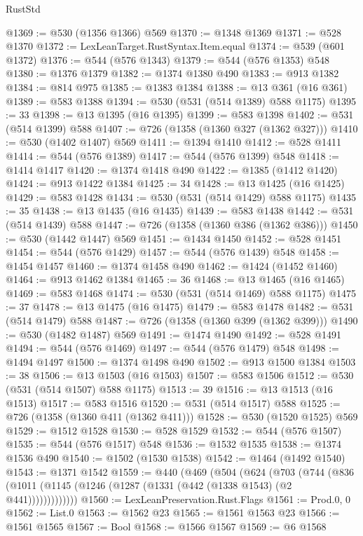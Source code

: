 \begin{lexlean}{RustStd}
\begin{coremodule}
@1369 := @530 (@1356 @1366) @569
@1370 := @1348 @1369
@1371 := @528 @1370
@1372 := LexLeanTarget.RustSyntax.Item.equal
@1374 := @539 (@601 @1372)
@1376 := @544 (@576 @1343)
@1379 := @544 (@576 @1353) @548
@1380 := @1376 @1379
@1382 := @1374 @1380 @490
@1383 := @913 @1382
@1384 := @814 @975
@1385 := @1383 @1384
@1388 := @13 @361 (@16 @361)
@1389 := @583 @1388
@1394 := @530 (@531 (@514 @1389) @588 @1175)
@1395 := 33
@1398 := @13 @1395 (@16 @1395)
@1399 := @583 @1398
@1402 := @531 (@514 @1399) @588
@1407 := @726 (@1358 (@1360 @327 (@1362 @327)))
@1410 := @530 (@1402 @1407) @569
@1411 := @1394 @1410
@1412 := @528 @1411
@1414 := @544 (@576 @1389)
@1417 := @544 (@576 @1399) @548
@1418 := @1414 @1417
@1420 := @1374 @1418 @490
@1422 := @1385 (@1412 @1420)
@1424 := @913 @1422 @1384
@1425 := 34
@1428 := @13 @1425 (@16 @1425)
@1429 := @583 @1428
@1434 := @530 (@531 (@514 @1429) @588 @1175)
@1435 := 35
@1438 := @13 @1435 (@16 @1435)
@1439 := @583 @1438
@1442 := @531 (@514 @1439) @588
@1447 := @726 (@1358 (@1360 @386 (@1362 @386)))
@1450 := @530 (@1442 @1447) @569
@1451 := @1434 @1450
@1452 := @528 @1451
@1454 := @544 (@576 @1429)
@1457 := @544 (@576 @1439) @548
@1458 := @1454 @1457
@1460 := @1374 @1458 @490
@1462 := @1424 (@1452 @1460)
@1464 := @913 @1462 @1384
@1465 := 36
@1468 := @13 @1465 (@16 @1465)
@1469 := @583 @1468
@1474 := @530 (@531 (@514 @1469) @588 @1175)
@1475 := 37
@1478 := @13 @1475 (@16 @1475)
@1479 := @583 @1478
@1482 := @531 (@514 @1479) @588
@1487 := @726 (@1358 (@1360 @399 (@1362 @399)))
@1490 := @530 (@1482 @1487) @569
@1491 := @1474 @1490
@1492 := @528 @1491
@1494 := @544 (@576 @1469)
@1497 := @544 (@576 @1479) @548
@1498 := @1494 @1497
@1500 := @1374 @1498 @490
@1502 := @913 @1500 @1384
@1503 := 38
@1506 := @13 @1503 (@16 @1503)
@1507 := @583 @1506
@1512 := @530 (@531 (@514 @1507) @588 @1175)
@1513 := 39
@1516 := @13 @1513 (@16 @1513)
@1517 := @583 @1516
@1520 := @531 (@514 @1517) @588
@1525 := @726 (@1358 (@1360 @411 (@1362 @411)))
@1528 := @530 (@1520 @1525) @569
@1529 := @1512 @1528
@1530 := @528 @1529
@1532 := @544 (@576 @1507)
@1535 := @544 (@576 @1517) @548
@1536 := @1532 @1535
@1538 := @1374 @1536 @490
@1540 := @1502 (@1530 @1538)
@1542 := @1464 (@1492 @1540)
@1543 := @1371 @1542
@1559 := @440
    (@469
      (@504
        (@624
          (@703
            (@744 (@836 (@1011 (@1145 (@1246 (@1287 (@1331 (@442 (@1338 @1543) (@2 @441)))))))))))))
@1560 := LexLeanPreservation.Rust.Flags
@1561 := Prod.{0, 0}
@1562 := List.{0}
@1563 := @1562 @23
@1565 := @1561 @1563 @23
@1566 := @1561 @1565
@1567 := Bool
@1568 := @1566 @1567
@1569 := @6 @1568

\end{coremodule}
\end{lexlean}
